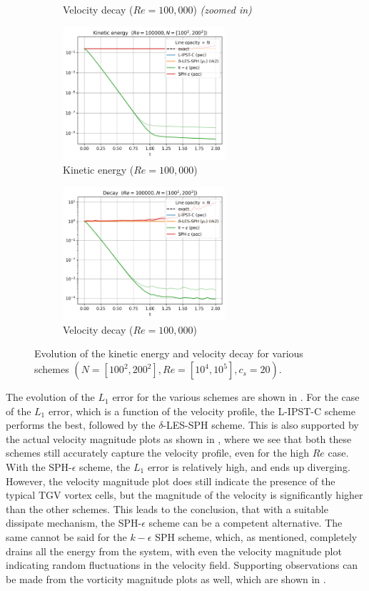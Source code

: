 \begin{figure}[htbp!]
\begin{subfigure}{7cm}
  \caption{Velocity decay ($Re = 100,000$) \textit{(zoomed in)}}
  \end{subfigure}
  \begin{subfigure}{7cm}
    \centering\includegraphics[width=6cm]{Code-Figures/long-tgv/ke_re_100000.png}
    \caption{Kinetic energy ($Re = 100,000$)}
    \end{subfigure}
  \begin{subfigure}{7cm}
    \centering\includegraphics[width=6cm]{Code-Figures/long-tgv/decay_re_100000.png}
    \caption{Velocity decay ($Re = 100,000$)}
  \end{subfigure}
  \caption{Evolution of the kinetic energy and velocity decay for various schemes $(N=[100^2, 200^2], Re=[10^4, 10^5], c_s=20)$.}
  \label{fig:ltgv-ke-decay}
\end{figure}

The evolution of the $L_1$ error for the various schemes are shown in .
For the case of the $L_1$ error, which is a function of the velocity profile, the L-IPST-C scheme performs the best, followed by the $\delta$-LES-SPH scheme.
This is also supported by the actual velocity magnitude plots as shown in , where we see that both these schemes still accurately capture the velocity profile, even for the high $Re$ case.
With the SPH-$\epsilon$ scheme, the $L_1$ error is relatively high, and ends up diverging. However, the velocity magnitude plot does still indicate the presence of the typical TGV vortex cells, but the magnitude of the velocity is significantly higher than the other schemes. This leads to the conclusion, that with a suitable dissipate mechanism, the SPH-$\epsilon$ scheme can be a competent alternative. 
The same cannot be said for the $k-\epsilon$ SPH scheme, which, as mentioned, completely drains all the energy from the system, with even the velocity magnitude plot indicating random fluctuations in the velocity field.
Supporting observations can be made from the vorticity magnitude plots as well, which are shown in .

